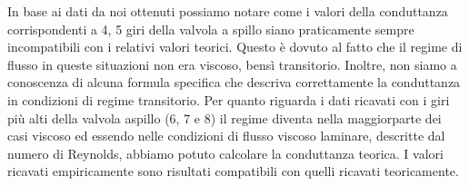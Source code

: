 
In base ai dati da noi ottenuti possiamo notare come i valori della conduttanza corrispondenti a 4, 5 giri della valvola a spillo siano praticamente sempre incompatibili con i relativi valori teorici. Questo è dovuto al fatto che il regime di flusso in queste situazioni non era viscoso, bensì transitorio. Inoltre, non siamo a conoscenza di alcuna formula specifica che descriva correttamente la conduttanza in condizioni di regime transitorio.
Per quanto riguarda i dati ricavati con i giri più alti della valvola  aspillo (6, 7 e 8) il regime diventa nella maggiorparte dei casi viscoso ed essendo nelle condizioni di flusso viscoso laminare, descritte dal numero di Reynolds, abbiamo potuto calcolare la conduttanza teorica. I valori ricavati empiricamente sono risultati compatibili con quelli ricavati teoricamente. %

